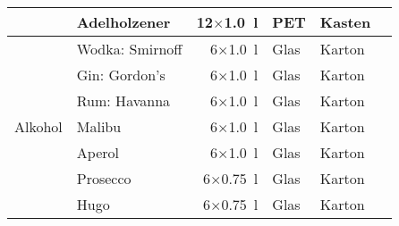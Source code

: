 {{\begin{center}
\begin{tabular}{|p{2cm}|lrll|l|}
  & Adelholzener    & 12$\times$\SI{1.0}{\litre}  & PET  & Kasten &  \\
  \hline
  \multirow{7}{*}{Alkohol}
  & Wodka: Smirnoff & 6$\times$\SI{1.0}{\litre}   & Glas & Karton &  \\
  & Gin: Gordon's   & 6$\times$\SI{1.0}{\litre}   & Glas & Karton &  \\
  & Rum: Havanna    & 6$\times$\SI{1.0}{\litre}   & Glas & Karton &  \\
  & Malibu          & 6$\times$\SI{1.0}{\litre}   & Glas & Karton &  \\
  & Aperol          & 6$\times$\SI{1.0}{\litre}   & Glas & Karton &  \\
  & Prosecco        & 6$\times$\SI{0.75}{\litre}  & Glas & Karton &  \\
  & Hugo            & 6$\times$\SI{0.75}{\litre}  & Glas & Karton &  \\
  \hline
\end{tabular}
\end{center}
}
}
